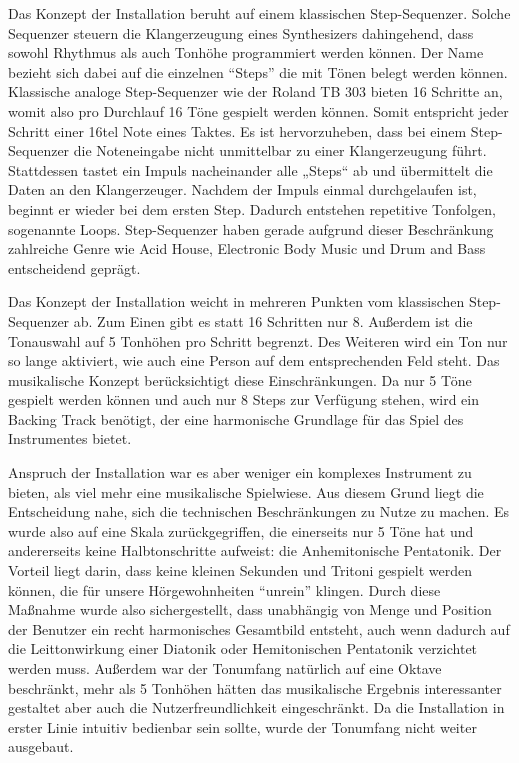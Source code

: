 \label{sec:music}

Das Konzept der Installation beruht auf einem klassischen Step-Sequenzer. Solche Sequenzer steuern die Klangerzeugung eines Synthesizers dahingehend, dass sowohl Rhythmus als auch Tonhöhe programmiert werden können. Der Name bezieht sich dabei auf die einzelnen \enquote{Steps} die mit Tönen belegt werden können. Klassische analoge Step-Sequenzer wie der Roland TB 303 bieten 16 Schritte an, womit also pro Durchlauf 16 Töne gespielt werden können. Somit entspricht jeder Schritt einer 16tel Note eines Taktes. Es ist hervorzuheben, dass bei einem Step-Sequenzer die Noteneingabe nicht unmittelbar zu einer Klangerzeugung führt. Stattdessen tastet ein Impuls nacheinander alle „Steps“ ab und übermittelt die Daten an den Klangerzeuger. Nachdem der Impuls einmal durchgelaufen ist, beginnt er wieder bei dem ersten Step. Dadurch entstehen repetitive Tonfolgen, sogenannte Loops. Step-Sequenzer haben gerade aufgrund dieser Beschränkung zahlreiche Genre wie Acid House, Electronic Body Music und Drum and Bass entscheidend geprägt.

Das Konzept der Installation weicht in mehreren Punkten vom klassischen Step-Sequenzer ab. Zum Einen gibt es statt 16 Schritten nur 8. Außerdem ist die Tonauswahl auf 5 Tonhöhen pro Schritt begrenzt. Des Weiteren wird ein Ton nur so lange aktiviert, wie auch eine Person auf dem entsprechenden Feld steht. Das musikalische Konzept berücksichtigt diese Einschränkungen. Da nur 5 Töne gespielt werden können und auch nur 8 Steps zur Verfügung stehen, wird ein Backing Track benötigt, der eine harmonische Grundlage für das Spiel des Instrumentes bietet.

Anspruch der Installation war es aber weniger ein komplexes Instrument zu bieten, als viel mehr eine musikalische Spielwiese. Aus diesem Grund liegt die Entscheidung nahe, sich die technischen Beschränkungen zu Nutze zu machen. Es wurde also auf eine Skala zurückgegriffen, die einerseits nur 5 Töne hat und andererseits keine Halbtonschritte aufweist: die Anhemitonische Pentatonik. Der Vorteil liegt darin, dass keine kleinen Sekunden und Tritoni gespielt werden können, die für unsere Hörgewohnheiten \enquote{unrein} klingen. Durch diese Maßnahme wurde also sichergestellt, dass unabhängig von Menge und Position der Benutzer ein recht harmonisches Gesamtbild entsteht, auch wenn dadurch auf die Leittonwirkung einer Diatonik oder Hemitonischen Pentatonik verzichtet werden muss. Außerdem war der Tonumfang natürlich auf eine Oktave beschränkt, mehr als 5 Tonhöhen hätten das musikalische Ergebnis interessanter gestaltet aber auch die Nutzerfreundlichkeit eingeschränkt. Da die Installation in erster Linie intuitiv bedienbar sein sollte, wurde der Tonumfang nicht weiter ausgebaut.

